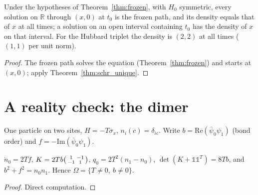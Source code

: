\begin{theorem}
  \label{thm:frozen_unique}
  \leanok
  Under the hypotheses of Theorem~\ref{thm:frozen}, with $H_0$ symmetric, every solution on $\mathbb R$ through
  $(x,0)$ at $t_0$ is the frozen path, and its density equals that of $x$ at all times; a solution on an open
  interval containing $t_0$ has the density of $x$ on that interval. For the Hubbard triplet the density is $(2,2)$
  at all times ($(1,1)$ per unit norm).
\end{theorem}
\begin{proof}
  \leanok
  The frozen path solves the equation (Theorem~\ref{thm:frozen}) and starts at $(x,0)$; apply
  Theorem~\ref{thm:schr_unique}.
\end{proof}

\section{A reality check: the dimer}

One particle on two sites, $H=-T\sigma_x$, $n_i(c)=\delta_{ic}$. Write $b=\mathrm{Re}(\bar\psi_0\psi_1)$ (bond order) and
$f=-\mathrm{Im}(\bar\psi_0\psi_1)$.

\begin{lemma}
  \label{lem:dimer_fb}
  \leanok
  $\dot n_0=2Tf$, $K=2Tb\begin{psmallmatrix}1&-1\\-1&1\end{psmallmatrix}$, $q_0=2T^2(n_1-n_0)$,
  $\det(K+\mathbb 1\mathbb 1^T)=8Tb$, and $b^2+f^2=n_0n_1$. Hence $\Omega=\{T\neq0,\ b\neq0\}$.
\end{lemma}
\begin{proof}
  \leanok
  Direct computation.
\end{proof}

